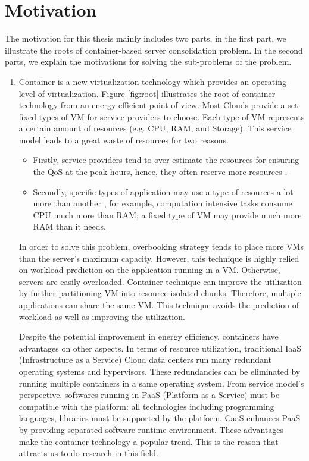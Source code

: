 
\section{Motivation}

The motivation for this thesis mainly includes two parts, in the first part, we illustrate the roots of container-based server consolidation problem. In the second parts, we explain the motivations for solving the sub-problems of the problem.
\begin{enumerate}

\subsection{Motivation For Container-based Server Consolidation Problem}

\item Container is a new virtualization technology which provides an operating level of virtualization.
Figure \ref{fig:root} illustrates the root of container technology from an energy efficient point of view. Most Clouds provide a set fixed types of VM for service providers to choose. Each type of VM represents a certain amount of resources (e.g. CPU, RAM, and Storage). This service model leads to a great waste of resources for two reasons. 
\begin{itemize}
	\item Firstly, service providers tend to over estimate the resources for ensuring the QoS at the peak hours, hence, they often reserve more resources \cite{Chaisiri:2012cv}. 
	\item Secondly, specific types of application may use a type of resources a lot more than another \cite{Tomas:2013iv}, for example, computation intensive tasks consume CPU much more than RAM; a fixed type of VM may provide much more RAM than it needs.
\end{itemize}
In order to solve this problem, overbooking strategy tends to place more VMs than the server's maximum capacity. However, this technique is highly relied on workload prediction on the application running in a VM. Otherwise, servers are easily overloaded. Container technique can improve the utilization by further partitioning VM into resource isolated chunks. Therefore, multiple applications can share the same VM. This technique avoids the prediction of workload as well as improving the utilization. 

Despite the potential improvement in energy efficiency, containers have advantages on other aspects. In terms of resource utilization, traditional IaaS (Infrastructure as a Service) Cloud data centers run many redundant operating systems and hypervisors. These redundancies can be eliminated by running multiple containers in a same operating system. From service model's perspective, softwares running in PaaS (Platform as a  Service) must be compatible with the platform: all technologies including programming languages, libraries must be supported by the platform. CaaS enhances PaaS by providing separated software runtime environment. These advantages make the container technology a popular trend. This is the reason that attracts us to
do research in this field.


\end{enumerate}
